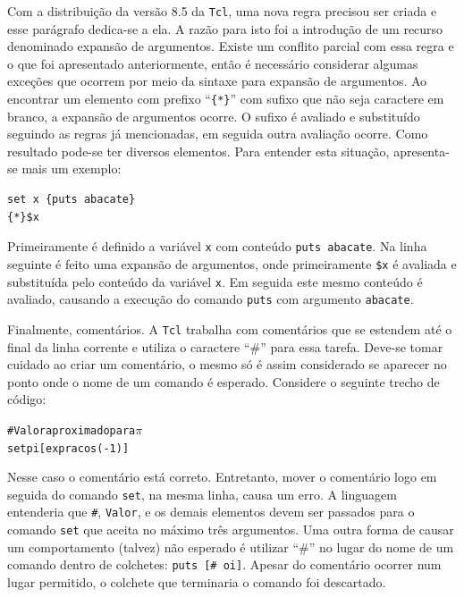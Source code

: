 
Com a distribuição da versão 8.5 da \texttt{Tcl}, uma nova
regra precisou ser criada e esse parágrafo dedica-se a ela. A razão
para isto foi a introdução de um recurso denominado expansão de
argumentos. Existe um
conflito parcial com essa regra e o que foi apresentado anteriormente,
então é necessário considerar algumas exceções que ocorrem por meio da
sintaxe para expansão de argumentos. Ao encontrar um elemento com
prefixo ``\verb!{*}!'' com sufixo que não seja caractere em
branco, a expansão de argumentos ocorre. O sufixo é avaliado e
substituído seguindo as regras já mencionadas, em seguida outra
avaliação ocorre. Como resultado pode-se ter diversos elementos. Para
entender esta situação, apresenta-se mais um exemplo:
\begin{verbatim}
set x {puts abacate}
{*}$x
\end{verbatim}
Primeiramente é definido a variável \verb!x! com conteúdo
\verb!puts abacate!. Na linha seguinte é feito uma expansão de argumentos, onde
primeiramente \verb!$x! é avaliada e substituída pelo conteúdo da
variável \verb!x!. Em seguida este mesmo conteúdo é avaliado, causando
a execução do comando \verb!puts! com argumento \verb!abacate!.


Finalmente, comentários. A \texttt{Tcl} trabalha com comentários que
se estendem até o final da linha corrente e utiliza o caractere ``\#''
para essa tarefa. Deve-se tomar cuidado ao criar um comentário, o
mesmo só é assim considerado se aparecer no ponto onde o nome de um
comando é esperado. Considere o seguinte trecho de código:
\begin{alltt}
\# Valor aproximado para \(\pi\)
set pi [expr {acos(-1)}]
\end{alltt}
Nesse caso o comentário está correto. Entretanto, mover
o comentário logo em seguida do comando \verb!set!, na mesma linha,
causa um erro. A linguagem entenderia que \verb!#!, \verb!Valor!, e os
demais elementos devem ser passados para o comando \verb!set! que
aceita no máximo três argumentos. Uma outra forma de
causar um comportamento (talvez) não esperado é utilizar ``\#'' no
lugar do nome de um comando dentro de colchetes:
 \verb!puts [# oi]!.
 Apesar do comentário ocorrer num lugar permitido, o colchete que
terminaria o comando foi descartado.


